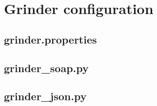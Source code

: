 \section{Grinder configuration}
\label{app:grinder}

\subsection{grinder.properties}


\subsection{grinder\_soap.py}


\subsection{grinder\_json.py}
